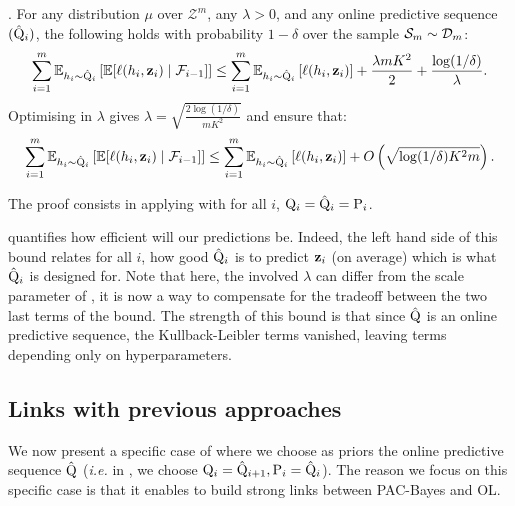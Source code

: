 \begin{corollary}
  \label{cor: test_bound_online}.
  For any distribution $\mu$ over $\mathcal{Z}^m$, any $\lambda>0$, and any online predictive sequence $(\hat{\mathrm{Q}}_i)$, the following holds with probability $1-\delta$ over the sample $\mathcal{S}_m\sim\mathcal{D}_{m}$:
  \begin{align*}
    \sum_{i=1}^m \mathbb{E}_{h_i\sim \hat{\mathrm{Q}}_{i}}\left[ \mathbb{E}[\ell(h_i,\mathbf{z}_i) \mid \mathcal{F}_{i-1}]    \right] \leq \sum_{i=1}^m \mathbb{E}_{h_i\sim \hat{\mathrm{Q}}_{i}}\left[ \ell(h_i,\mathbf{z}_i) \right] + \frac{\lambda m K^2}{2} + \frac{\log(1/\delta)}{\lambda}.
  \end{align*}
  Optimising in $\lambda$ gives $\lambda= \sqrt{\frac{2\log(1/\delta)}{mK^2} }$ and ensure that:
  \begin{align*}
    \sum_{i=1}^m \mathbb{E}_{h_i\sim \hat{\mathrm{Q}}_{i}}\left[ \mathbb{E}[\ell(h_i,\mathbf{z}_i) \mid \mathcal{F}_{i-1}]    \right] \leq \sum_{i=1}^m \mathbb{E}_{h_i\sim \hat{\mathrm{Q}}_{i}}\left[ \ell(h_i,\mathbf{z}_i) \right] + O\left(\sqrt{\log(1/\delta) K^2m}\right).
  \end{align*}

\end{corollary}

The proof consists in applying  with for all $i$, $\mathrm{Q}_{i}= \hat{\mathrm{Q}}_{i}= \mathrm{P}_{i}$.

 quantifies how efficient will our predictions be. Indeed, the left hand side of this bound relates for all $i$, how good $\hat{\mathrm{Q}}_i$ is to predict $\mathbf{z}_i$ (on average) which is what $\hat{\mathrm{Q}}_i$ is designed for.
Note that here, the involved $\lambda$ can differ from the scale parameter of , it is now a way to compensate for the tradeoff between the two last terms of the bound. The strength of this bound is that since $\hat{\mathrm{Q}}$ is an online predictive sequence, the Kullback-Leibler terms vanished, leaving terms depending only on hyperparameters.


\subsection*{Links with previous approaches}

We now present a specific case of  where we choose as priors the online predictive sequence $\hat{\mathrm{Q}}$ (\emph{i.e.} in , we choose $\mathrm{Q}_{i}=\hat{\mathrm{Q}}_{i+1}, \mathrm{P}_{i}= \hat{\mathrm{Q}}_i$). The reason we focus on this specific case is that it enables to build strong links between PAC-Bayes and OL.

